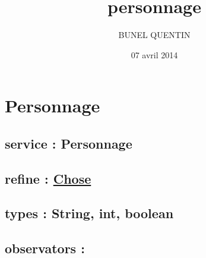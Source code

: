 \documentclass[11pt]{article}
\title{personnage}
\author{BUNEL QUENTIN}
\date{07 avril 2014}
\begin{document}
\maketitle

\setcounter{tocdepth}{3}
\tableofcontents
\vspace*{1cm}
\section{Personnage}
\label{sec-1}

\subsection{service : Personnage}
\label{sec-1.1}

\subsection{refine : \href{file:///users/Etu5/3000675/Desktop/spec/chose.org}{Chose}}
\label{sec-1.2}

\subsection{types : String, int, boolean}
\label{sec-1.3}



\subsection{observators :}
\label{sec-1.4}

\subsubsection{}
\end{document}
